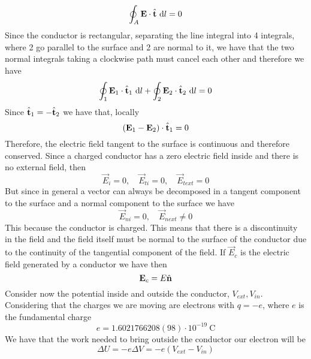 \documentclass[../electromagnetism]{subfiles}
\begin{document}
\begin{equation}
	\oint_A\mathbf{E}\cdot\hat{\mathbf{t}}\ \mathrm{d} l=0
	\label{eq:between2cond}
\end{equation}
Since the conductor is rectangular, separating the line integral into 4 integrals, where 2 go parallel to the surface and 2 are normal to it, we have that the two normal integrals taking a clockwise path must cancel each other and therefore we have
\begin{equation}
	\oint_1\mathbf{E}_1\cdot\hat{\mathbf{t}}_1\ \mathrm{d} l+\oint_2\mathbf{E}_2\cdot\hat{\mathbf{t}}_2\ \mathrm{d} l=0
	\label{eq:parallelint}
\end{equation}
Since $\hat{\mathbf{t}}_1=-\hat{\mathbf{t}}_2$ we have that, locally
\begin{equation}
	\left( \mathbf{E}_1-\mathbf{E}_2 \right)\cdot\hat{\mathbf{t}}_1=0
	\label{eq:constangcond}
\end{equation}
Therefore, the electric field tangent to the surface is continuous and therefore conserved.
Since a charged conductor has a zero electric field inside and there is no external field, then
\begin{equation*}
	\vec{E}_i=0,\quad\vec{E}_{ti}=0,\quad\vec{E}_{text}=0
\end{equation*}
But since in general a vector can always be decomposed in a tangent component to the surface and a normal component to the surface we have
\begin{equation*}
	\vec{E}_{ni}=0,\quad\vec{E}_{next}\ne0
\end{equation*}
This because the conductor is charged. This means that there is a discontinuity in the field and the field itself must be normal to the surface of the conductor due to the continuity of the tangential component of the field. If $\vec{E}_c$ is the electric field generated by a conductor we have then
\begin{equation}
	\mathbf{E}_c=E\hat{\mathbf{n}}
	\label{eq:conductorfield}
\end{equation}
Consider now the potential inside and outside the conductor, $V_{ext},V_{in}$. Considering that the charges we are moving are electrons with $q=-e$, where $e$ is the fundamental charge
\begin{equation}
	e=1.6021766208(98)\cdot10^{-19}\ \mathrm{C}
	\label{eq:fundcharge}
\end{equation}
We have that the work needed to bring outside the conductor our electron will be
\begin{equation}
	\Delta U=-e\Delta V=-e\left( V_{ext}-V_{in} \right)
	\label{eq:workfunction}
\end{equation}
\end{document}
